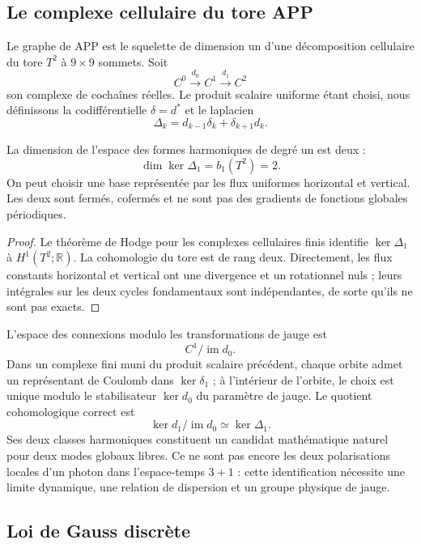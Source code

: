 \subsection{Le complexe cellulaire du tore APP}
\label{v:rec:completaciones:section:08}

Le graphe de APP est le squelette de dimension un d’une décomposition cellulaire du tore
\(T^2\) à \(9\times9\) sommets. Soit
\[
 C^0\xrightarrow{d_0}C^1\xrightarrow{d_1}C^2
\]
son complexe de cochaînes réelles. Le produit scalaire uniforme étant choisi,
nous définissons la codifférentielle \(\delta=d^*\) et le laplacien
\[
 \Delta_k=d_{k-1}\delta_k+\delta_{k+1}d_k.
\]

\begin{theorem}
\label{v:rec:completaciones:statement:04}
La dimension de l’espace des formes harmoniques de degré un est deux :
\[
 \dim\ker\Delta_1=b_1(T^2)=2.
\]
On peut choisir une base représentée par les flux uniformes horizontal et
vertical. Les deux sont fermés, cofermés et ne sont pas des gradients de fonctions
globales périodiques.
\end{theorem}

\begin{proof}
Le théorème de Hodge pour les complexes cellulaires finis identifie
\(\ker\Delta_1\) à \(H^1(T^2;\mathbb R)\). La cohomologie du tore est de
rang deux. Directement, les flux constants horizontal et vertical ont
une divergence et un rotationnel nuls ; leurs intégrales sur les deux cycles
fondamentaux sont indépendantes, de sorte qu’ils ne sont pas exacts.
\end{proof}

L’espace des connexions modulo les transformations de jauge est
\[
 C^1/\operatorname{im}d_0.
\]
Dans un complexe fini muni du produit scalaire précédent, chaque orbite
admet un représentant de Coulomb dans \(\ker\delta_1\) ; à l’intérieur de l’orbite,
le choix est unique modulo le stabilisateur \(\ker d_0\) du paramètre de
jauge. Le quotient cohomologique correct est
\[
 \ker d_1/\operatorname{im}d_0
 \simeq \ker\Delta_1 .
\]
Ses deux classes harmoniques constituent un candidat mathématique naturel pour
deux modes globaux libres. Ce ne sont pas encore les deux polarisations locales d’un
photon dans l’espace-temps \(3+1\) : cette identification nécessite une
limite dynamique, une relation de dispersion et un groupe physique de jauge.

\subsection{Loi de Gauss discrète}
\label{v:rec:completaciones:section:09}


